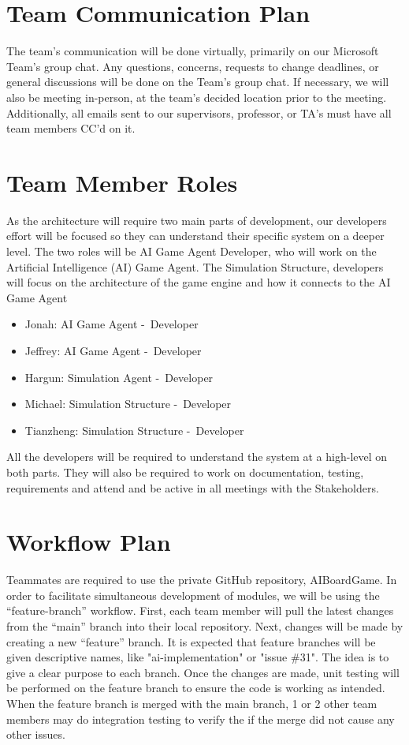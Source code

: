 \documentclass{article}
\begin{document}
\section{Team Communication Plan}
The team’s communication will be done virtually, primarily on our Microsoft Team’s group chat. Any questions, concerns, requests to change deadlines, or general discussions will be done on the Team’s group chat. If necessary, we will also be meeting in-person, at the team’s decided location prior to the meeting. 
Additionally, all emails sent to our supervisors, professor, or TA’s must have all team members CC’d on it.
\section{Team Member Roles}
As the architecture will require two main parts of development, our developers effort will be focused so they can understand their specific system on a deeper level.
The two roles will be AI Game Agent Developer, who will work on the Artificial Intelligence (AI) Game Agent. The Simulation Structure, developers will focus on the architecture of the game engine and how it connects to the AI Game Agent
\begin{itemize}
	\item Jonah: AI Game Agent -\ Developer
	\item Jeffrey: AI Game Agent -\ Developer
	\item Hargun: Simulation Agent -\ Developer
	\item Michael: Simulation Structure -\ Developer
	\item Tianzheng: Simulation Structure -\ Developer
\end{itemize}
All the developers will be required to understand the system at a high-level on both parts. They will also be required to work on documentation, testing, requirements and attend and be active in all meetings with the Stakeholders.
\section{Workflow Plan}
Teammates are required to use the private GitHub repository, AIBoardGame. 
In order to facilitate simultaneous development of modules, we will be using the “feature-branch” workflow. First, each team member will pull the latest changes from the “main” branch into their local repository. 
Next, changes will be made by creating a new “feature” branch. It is expected that feature branches will be given descriptive names, like "ai-implementation" or "issue \#31". The idea is to give a clear purpose to each branch. 
Once the changes are made, unit testing will be performed on the feature branch to ensure the code is working as intended. 
When the feature branch is merged with the main branch, 1 or 2 other team members may do integration testing to verify the if the merge did not cause any other issues. 
\end{document}
